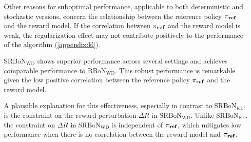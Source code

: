 Other reasons for suboptimal performance, applicable to both deterministic and stochastic versions, concern the relationship between the reference policy $\pi_{\textnormal{\textbf{ref}}}$ and the reward model. If the correlation between $\pi_{\textnormal{\textbf{ref}}}$ and the reward model is weak, the regularization effect may not contribute positively to the performance of the algorithm (\cref{appendix:kl}).

$\mathrm{SRBoN}_{\mathrm{WD}}$ shows superior performance across several settings and achieves comparable performance to $\mathrm{RBoN}_{\mathrm{WD}}$. This robust performance is remarkable given the low positive correlation between the reference policy $\pi_{\textnormal{\textbf{ref}}}$ and the reward model.

A plausible explanation for this effectiveness, especially in contrast to $\mathrm{SRBoN}_{\mathrm{KL}}$, is the constraint on the reward perturbation $\Delta R$ in $\mathrm{SRBoN}_{\mathrm{WD}}$. Unlike $\mathrm{SRBoN}_{\mathrm{KL}}$, the constraint on $\Delta R$ in $\mathrm{SRBoN}_{\mathrm{WD}}$ is independent of $\pi_{\textnormal{\textbf{ref}}}$, which mitigates low performance when there is no correlation between the reward model and $\pi_{\textnormal{\textbf{ref}}}$. 


